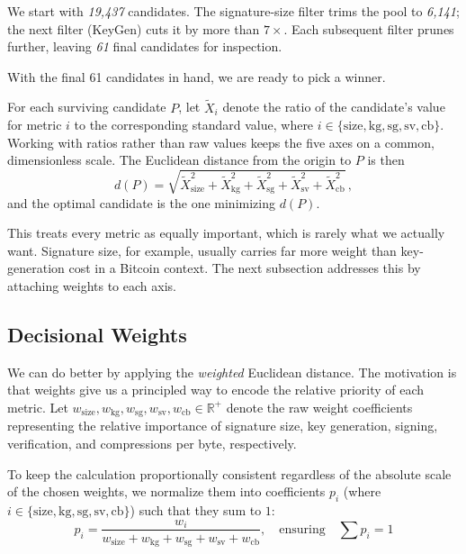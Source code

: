 We start with \emph{19,437} candidates. The signature-size filter trims the pool to \emph{6,141}; the next filter (KeyGen) cuts it by more than $7\times$. Each subsequent filter prunes further, leaving \emph{61} final candidates for inspection.

With the final 61 candidates in hand, we are ready to pick a winner.

For each surviving candidate $P$, let $\widetilde{X}_i$ denote the ratio of the candidate's value for metric $i$ to the corresponding standard value, where $i \in \{\text{size}, \text{kg}, \text{sg}, \text{sv}, \text{cb}\}$. Working with ratios rather than raw values keeps the five axes on a common, dimensionless scale. The Euclidean distance from the origin to $P$ is then
\begin{equation}
    d(P) = \sqrt{\widetilde{X}_{\text{size}}^2 + \widetilde{X}_{\text{kg}}^2 + \widetilde{X}_{\text{sg}}^2 + \widetilde{X}_{\text{sv}}^2 + \widetilde{X}_{\text{cb}}^2}\,,
    \label{eq:euclidean_distance}
\end{equation}
and the optimal candidate is the one minimizing $d(P)$.

This treats every metric as equally important, which is rarely what we actually want. Signature size, for example, usually carries far more weight than key-generation cost in a Bitcoin context. The next subsection addresses this by attaching weights to each axis.

\subsection{Decisional Weights} \label{sec:decisional-weights}
We can do better by applying the \emph{weighted} Euclidean distance. The motivation is that weights give us a principled way to encode the relative priority of each metric. Let $w_{\text{size}}, w_{\text{kg}}, w_{\text{sg}}, w_{\text{sv}}, w_{\text{cb}} \in \mathbb{R}^+$ denote the raw weight coefficients representing the relative importance of signature size, key generation, signing, verification, and compressions per byte, respectively.

To keep the calculation proportionally consistent regardless of the absolute scale of the chosen weights, we normalize them into coefficients $p_i$ (where $i \in \{\text{size}, \text{kg}, \text{sg}, \text{sv}, \text{cb}\}$) such that they sum to $1$:
\begin{equation}
    p_i = \frac{w_i}{w_{\text{size}} + w_{\text{kg}} + w_{\text{sg}} + w_{\text{sv}} + w_{\text{cb}}}, \quad \text{ensuring} \quad \sum p_i = 1
    \label{eq:weight_normalization}
\end{equation}

